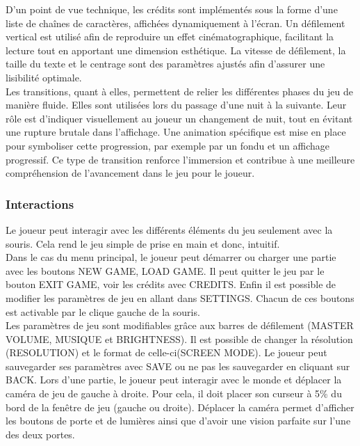 \documentclass[11pt, a4paper]{article}
\begin{document}
D’un point de vue technique, les crédits sont implémentés sous la forme d’une liste de chaînes de caractères, affichées dynamiquement à l’écran. Un défilement vertical est utilisé afin de reproduire un effet cinématographique, facilitant la lecture tout en apportant une dimension esthétique. La vitesse de défilement, la taille du texte et le centrage sont des paramètres ajustés afin d’assurer une lisibilité optimale.\\

Les transitions, quant à elles, permettent de relier les différentes phases du jeu de manière fluide. Elles sont utilisées lors du passage d’une nuit à la suivante. Leur rôle est d’indiquer visuellement au joueur un changement de nuit, tout en évitant une rupture brutale dans l’affichage. Une animation spécifique est mise en place pour symboliser cette progression, par exemple par un fondu et un affichage progressif. Ce type de transition renforce l’immersion et contribue à une meilleure compréhension de l’avancement dans le jeu pour le joueur.

\subsubsection{Interactions}
Le joueur peut interagir avec les différents éléments du jeu seulement avec la souris. Cela rend le jeu simple de prise en main et donc, intuitif.\\

Dans le cas du menu principal, le joueur peut démarrer ou charger une partie avec les boutons NEW GAME, LOAD GAME. Il peut quitter le jeu par le bouton EXIT GAME, voir les crédits avec CREDITS. Enfin il est possible de modifier les paramètres de jeu en allant dans SETTINGS. Chacun de ces boutons est activable par le clique gauche de la souris.\\

Les paramètres de jeu sont modifiables grâce aux barres de défilement (MASTER VOLUME, MUSIQUE et BRIGHTNESS). Il est possible de changer la résolution (RESOLUTION) et le format de celle-ci(SCREEN MODE). Le joueur peut sauvegarder ses paramètres avec SAVE ou ne pas les sauvegarder en cliquant sur BACK.
\newpage
Lors d'une partie, le joueur peut interagir avec le monde et déplacer la caméra de jeu de gauche à droite. Pour cela, il doit placer son curseur à 5\% du bord de la fenêtre de jeu (gauche ou droite). Déplacer la caméra permet d'afficher les boutons de porte et de lumières ainsi que d'avoir une vision parfaite sur l'une des deux portes.\\
\end{document}

